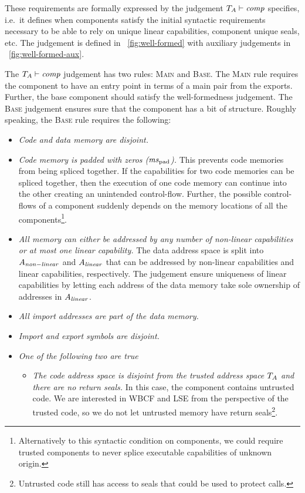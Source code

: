 \documentclass[acmsmall,screen]{acmart}\settopmatter{}
\renewcommand{\comp}{\var{comp}}
\newcommand{\wdjud}[2][ ]{#1 \vdash #2}
\newenvironment{jversion}%
    {\color{OliveGreen}}{}
\begin{document}
\begin{jversion}
These requirements are formally expressed by the judgement $\wdjud[\ta]{\comp}$ specifies, i.e.\ it defines when components satisfy the initial syntactic requirements necessary to be able to rely on unique linear capabilities, component unique seals, etc.
The judgement is defined in \figurename~\ref{fig:well-formed} with auxiliary judgements in \figurename~\ref{fig:well-formed-aux}.

The $\wdjud[\ta]{\comp}$ judgement has two rules: \textsc{Main} and \textsc{Base}.
The \textsc{Main} rule requires the component to have an entry point in terms of a main pair from the exports.
Further, the base component should satisfy the well-formedness judgement.
The \textsc{Base} judgement ensures sure that the component has a bit of structure.
Roughly speaking, the \textsc{Base} rule requires the following:
\begin{itemize}
\item \textit{Code and data memory are disjoint.}
\item \textit{Code memory is padded with zeros ($\mspad$).}
  This prevents code memories from being spliced together.
  If the capabilities for two code memories can be spliced together, then the execution of one code memory can continue into the other creating an unintended control-flow.
  Further, the possible control-flows of a component suddenly depends on the memory locations of all the components\footnote{Alternatively to this syntactic condition on components, we could require trusted components to never splice executable capabilities of unknown origin.}.
\item \textit{All memory can either be addressed by any number of non-linear capabilities or at most one linear capability.}
  The data address space is split into $A_{\mathit{non-linear}}$ and $A_{\mathit{linear}}$ that can be addressed by non-linear capabilities and linear capabilities, respectively.
  The judgement ensure uniqueness of linear capabilities by letting each address of the data memory take sole ownership of addresses in $A_{\mathit{linear}}$.
\item \textit{All import addresses are part of the data memory.} 
\item \textit{Import and export symbols are disjoint.}
\item \textit{One of the following two are true}
  \begin{itemize}
  \item \textit{The code address space is disjoint from the trusted address space $T_{A}$ and there are no return seals.} In this case, the component contains untrusted code. We are interested in WBCF and LSE from the perspective of the trusted code, so we do not let untrusted memory have return seals\footnote{Untrusted code still has access to seals that could be used to protect calls.}.

\end{itemize}
\end{itemize}
\end{jversion}
\end{document}
